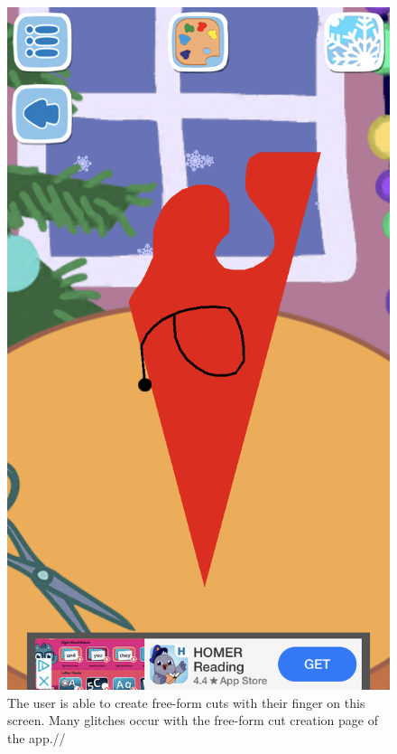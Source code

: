 \documentclass[11pt]{article}
\begin{document}
\begin{figure}[!ht]
\begin{minipage}{0.32\textwidth}
                            \label{fig:peppaShapes}
                        \end{minipage}
                        \begin{minipage}{0.32\textwidth}
                            \centering
                            \includegraphics[width=0.8\linewidth]{Images/peppa/peppaFreeFormCut.PNG}
                             \caption{The user is able to create free-form cuts with their finger on this screen. Many glitches occur with the free-form cut creation page of the app.//}
                            \label{fig:peppaFreeFormCut}
                        \end{minipage}
                        \begin{minipage}{0.32\textwidth}
                            \centering

\end{minipage}
\end{figure}
\end{document}

